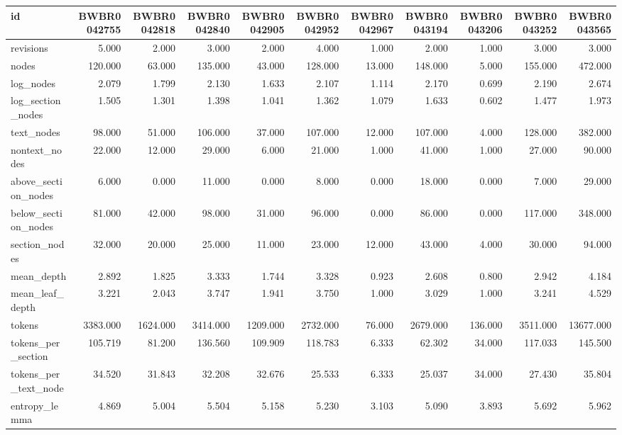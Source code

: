 \begin{tabular}{lrrrrrrrrrr}
\toprule
id & BWBR0042755 & BWBR0042818 & BWBR0042840 & BWBR0042905 & BWBR0042952 & BWBR0042967 & BWBR0043194 & BWBR0043206 & BWBR0043252 & BWBR0043565 \\
\midrule
revisions & 5.000 & 2.000 & 3.000 & 2.000 & 4.000 & 1.000 & 2.000 & 1.000 & 3.000 & 3.000 \\
\cline{1-11}
nodes & 120.000 & 63.000 & 135.000 & 43.000 & 128.000 & 13.000 & 148.000 & 5.000 & 155.000 & 472.000 \\
\cline{1-11}
log\_nodes & 2.079 & 1.799 & 2.130 & 1.633 & 2.107 & 1.114 & 2.170 & 0.699 & 2.190 & 2.674 \\
\cline{1-11}
log\_section\_nodes & 1.505 & 1.301 & 1.398 & 1.041 & 1.362 & 1.079 & 1.633 & 0.602 & 1.477 & 1.973 \\
\cline{1-11}
text\_nodes & 98.000 & 51.000 & 106.000 & 37.000 & 107.000 & 12.000 & 107.000 & 4.000 & 128.000 & 382.000 \\
\cline{1-11}
nontext\_nodes & 22.000 & 12.000 & 29.000 & 6.000 & 21.000 & 1.000 & 41.000 & 1.000 & 27.000 & 90.000 \\
\cline{1-11}
above\_section\_nodes & 6.000 & 0.000 & 11.000 & 0.000 & 8.000 & 0.000 & 18.000 & 0.000 & 7.000 & 29.000 \\
\cline{1-11}
below\_section\_nodes & 81.000 & 42.000 & 98.000 & 31.000 & 96.000 & 0.000 & 86.000 & 0.000 & 117.000 & 348.000 \\
\cline{1-11}
section\_nodes & 32.000 & 20.000 & 25.000 & 11.000 & 23.000 & 12.000 & 43.000 & 4.000 & 30.000 & 94.000 \\
\cline{1-11}
mean\_depth & 2.892 & 1.825 & 3.333 & 1.744 & 3.328 & 0.923 & 2.608 & 0.800 & 2.942 & 4.184 \\
\cline{1-11}
mean\_leaf\_depth & 3.221 & 2.043 & 3.747 & 1.941 & 3.750 & 1.000 & 3.029 & 1.000 & 3.241 & 4.529 \\
\cline{1-11}
tokens & 3383.000 & 1624.000 & 3414.000 & 1209.000 & 2732.000 & 76.000 & 2679.000 & 136.000 & 3511.000 & 13677.000 \\
\cline{1-11}
tokens\_per\_section & 105.719 & 81.200 & 136.560 & 109.909 & 118.783 & 6.333 & 62.302 & 34.000 & 117.033 & 145.500 \\
\cline{1-11}
tokens\_per\_text\_node & 34.520 & 31.843 & 32.208 & 32.676 & 25.533 & 6.333 & 25.037 & 34.000 & 27.430 & 35.804 \\
\cline{1-11}
entropy\_lemma & 4.869 & 5.004 & 5.504 & 5.158 & 5.230 & 3.103 & 5.090 & 3.893 & 5.692 & 5.962 \\

\end{tabular}
